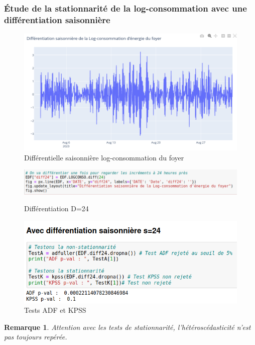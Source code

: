\documentclass{beamer}
\newtheorem{rmq}{Remarque}
\theoremstyle{definition}
\begin{document}
\begin{frame}
	\frametitle{Étude de la stationnarité de la log-consommation avec une différentiation saisonnière}
	\begin{minipage}[t]{1\linewidth}
		\begin{minipage}[c]{0.55\linewidth}\centering\begin{figure}
				\centering
				\includegraphics[width=1\linewidth]{8.png}
				\caption*{Différentielle saisonnière log-consommation du foyer}
		\end{figure}\end{minipage}\hfill 
		\begin{minipage}[c]{0.44\linewidth}\centering\begin{figure}
				\begin{center}
					\includegraphics[width=1\linewidth]{7.png}
					\caption*{Différentiation D=24}
					\includegraphics[width=1\linewidth]{9.png}			
					\caption*{Tests ADF et KPSS}
				\end{center}
				
		\end{figure}\end{minipage}
		\begin{rmq}
		Attention avec les tests de stationnarité, l'hétéroscédasticité n'est pas toujours repérée.
	\end{rmq}
	\end{minipage}
	
\end{frame}
\end{document}
